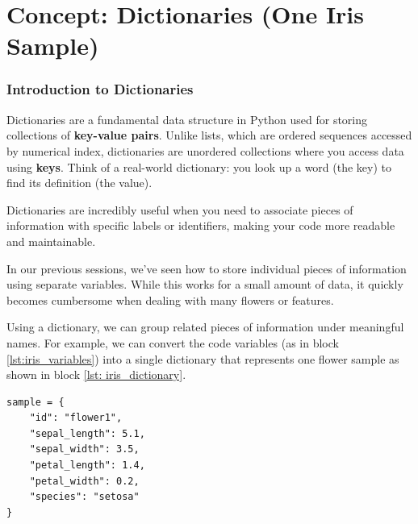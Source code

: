 
\section{Concept: Dictionaries (One Iris Sample)}
\label{sec:dictionaries}

\subsubsection{Introduction to Dictionaries}
\label{sec:ses3_dictionaries}

Dictionaries are a fundamental data structure in Python used for storing collections of \textbf{key-value pairs}. Unlike lists, which are ordered sequences accessed by numerical index, dictionaries are unordered collections where you access data using \textbf{keys}. Think of a real-world dictionary: you look up a word (the key) to find its definition (the value).

Dictionaries are incredibly useful when you need to associate pieces of information with specific labels or identifiers, making your code more readable and maintainable.

In our previous sessions, we've seen how to store individual pieces of information using separate variables. While this works for a small amount of data, it quickly becomes cumbersome when dealing with many flowers or features.

Using a dictionary, we can group related pieces of information under meaningful names. For example, we can convert the code variables (as in block  \ref{lst:iris_variables}) into a single dictionary that represents one flower sample as shown in block \ref{lst: iris_dictionary}.


\begin{listing}[H]
\caption{Example Iris dataset variables}
\label{lst: iris_dictionary}

\begin{verbatim}
sample = {
    "id": "flower1",
    "sepal_length": 5.1,
    "sepal_width": 3.5,
    "petal_length": 1.4,
    "petal_width": 0.2,
    "species": "setosa"
}
\end{verbatim}
\end{listing}

